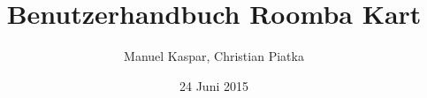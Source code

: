 
\title{Benutzerhandbuch Roomba Kart}
\date{24 Juni 2015}
\author{Manuel Kaspar, Christian Piatka}


\maketitle \thispagestyle{empty}
\vspace{3cm}
\tableofcontents
\clearpage



